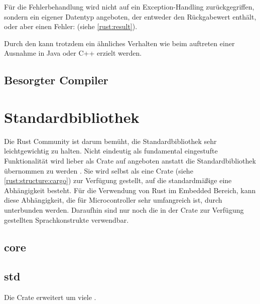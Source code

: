 
Für die Fehlerbehandlung wird nicht auf ein Exception-Handling zurückgegriffen, sondern ein eigener Datentyp angeboten, der entweder den Rückgabewert enthält, oder aber einen Fehler:  (siehe \autoref{rust:result}).

Durch den  kann trotzdem ein ähnliches Verhalten wie beim auftreten einer Ausnahme in Java oder C++ erzielt werden. 


\subsection{Besorgter Compiler}


\section{Standardbibliothek}
\label{rust:stdlib}

Die Rust Community ist darum bemüht, die Standardbibliothek sehr leichtgewichtig zu halten.
Nicht eindeutig als fundamental eingestufte Funktionalität wird lieber als Crate auf  angeboten anstatt die Standardbibliothek übernommen zu werden . 
Sie wird selbst als eine Crate (siehe \autoref{rust:structure:cargo}) zur Verfügung gestellt, auf die standardmäßige eine Abhängigkeit besteht.
Für die Verwendung von Rust im Embedded Bereich, kann diese Abhängigkeit, die für Microcontroller sehr umfangreich ist, durch \rustcinline{#![no_std]} unterbunden werden.
Daraufhin sind nur noch die in der  Crate zur Verfügung gestellten Sprachkonstrukte verwendbar.

\subsection{core}
\label{rust:core}


\subsection{std}
\label{rust:std}

Die Crate  erweitert  um viele .      

